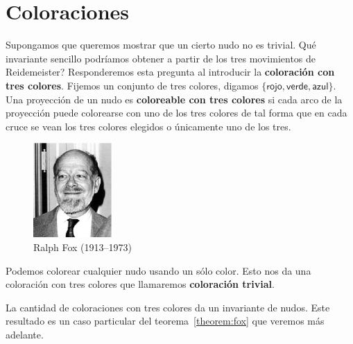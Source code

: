\documentclass[graybox]{svmult}
\begin{document}
\section{Coloraciones}
\label{section:coloreos}
\label{block:3coloring}
Supongamos que queremos mostrar que un cierto nudo no es trivial. \textquestiondown Qué
invariante sencillo podríamos obtener a partir de los tres movimientos de
Reidemeister? Responderemos esta pregunta al introducir la \textbf{coloración 
con tres colores}. Fijemos un conjunto de tres colores,
digamos $\{\textsf{rojo},\textsf{verde},\textsf{azul}\}$.  Una proyección
de un nudo es \textbf{coloreable con tres colores} si cada arco de la
proyección puede colorearse con uno de los tres colores de tal forma que en
cada cruce se vean los tres colores elegidos o únicamente uno de los tres. 

\begin{figure}[ht]
	\centering
    \includegraphics[width=30mm,height=36mm]{images/fox}
    \caption{Ralph Fox (1913--1973)}
\end{figure}

Podemos colorear cualquier nudo usando un sólo color. Esto nos da una coloración 
con tres colores que llamaremos \textbf{coloración trivial}. 

La cantidad de coloraciones con tres colores da un invariante de nudos. Este
resultado es un caso particular del teorema~\ref{theorem:fox} que veremos más
adelante. 
\end{document}
